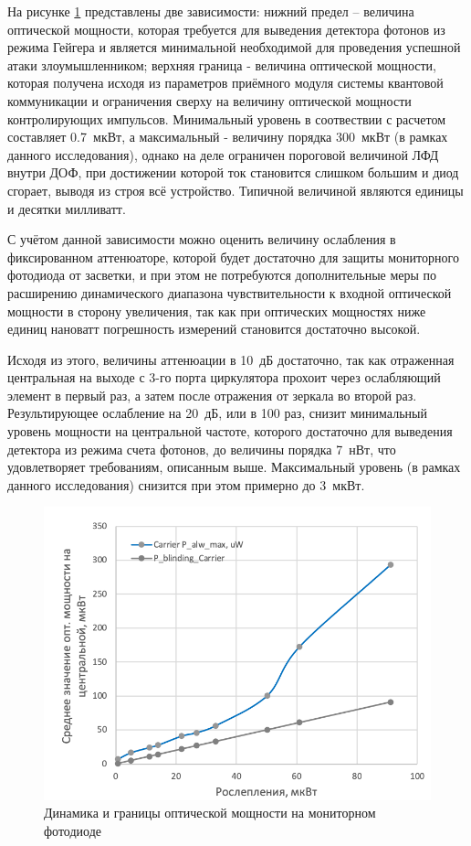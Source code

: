  На рисунке \ref{fig:Watchdog_photodiode} представлены две зависимости: нижний предел -- величина оптической мощности, которая требуется для выведения детектора фотонов из режима Гейгера и является минимальной необходимой для проведения успешной атаки злоумышленником; верхняя граница - величина оптической мощности, которая получена исходя из параметров приёмного модуля системы квантовой коммуникации и ограничения сверху на величину оптической мощности контролирующих импульсов. Минимальный уровень в соотвествии с расчетом составляет 0.7~мкВт, а максимальный - величину порядка 300~мкВт (в рамках данного исследования), однако на деле ограничен пороговой величиной ЛФД внутри ДОФ, при достижении которой ток становится слишком большим и диод сгорает, выводя из строя всё устройство. Типичной величиной являются единицы и десятки милливатт. 


С учётом данной зависимости можно оценить величину ослабления в фиксированном аттенюаторе, которой будет достаточно для защиты мониторного фотодиода от засветки, и при этом не потребуются дополнительные меры по расширению динамического диапазона чувствительности к входной оптической мощности в сторону увеличения, так как при оптических мощностях ниже единиц нановатт погрешность измерений становится достаточно высокой.   

Исходя из этого, величины аттенюации в 10~дБ достаточно, так как отраженная центральная на выходе с 3-го порта циркулятора прохоит через ослабляющий элемент в первый раз, а затем после отражения от зеркала во второй раз. Результирующее ослабление на 20~дБ, или в 100 раз, снизит минимальный уровень мощности на центральной частоте, которого достаточно для выведения детектора из режима счета фотонов, до величины порядка 7~нВт, что удовлетворяет требованиям, описанным выше. Максимальный уровень (в рамках данного исследования) снизится при этом примерно до 3~мкВт. 

 \begin{figure}[ht]
  \centering
  \includegraphics[scale=0.5]{images/Watchdog_photodiode.png}
  \caption{Динамика и границы оптической мощности на мониторном фотодиоде}
  \label{fig:Watchdog_photodiode}
\end{figure}


